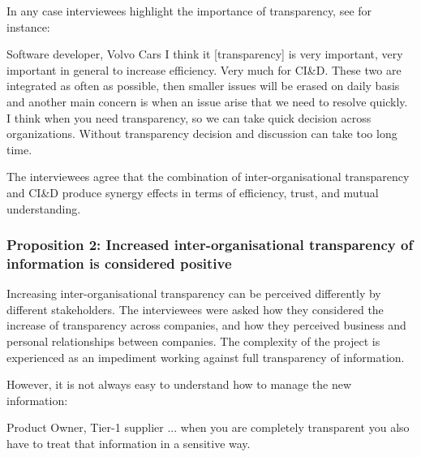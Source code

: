 In any case interviewees highlight the importance of transparency, see for instance:

\begin{aquote}{Software developer, Volvo Cars}
I think it [transparency] is very important, very important in general to increase efficiency. Very much for CI\&D. These two are integrated as often as possible, then smaller issues will be erased on daily basis and another main concern is when an issue arise that we need to resolve quickly. I think when you need transparency, so we can take quick decision across organizations. Without transparency decision and discussion can take too long time.
\end{aquote}

 The interviewees agree that the combination of inter-organisational transparency and CI\&D produce synergy effects in terms of efficiency, trust, and mutual understanding.

\vspace{.2cm}
\subsubsection{Proposition 2: Increased inter-organisational transparency of information is considered positive}

Increasing inter-organisational transparency can be perceived differently by different stakeholders. The interviewees were asked how they considered the increase of transparency across companies, and how they perceived business and personal relationships between companies. The complexity of the project is experienced as an impediment working against full transparency of information.

However, it is not always easy to understand how to manage the new information:

\begin{aquote}{Product Owner, Tier-1 supplier}
... when you are completely transparent you also have to treat that information in a sensitive way.
\end{aquote}

